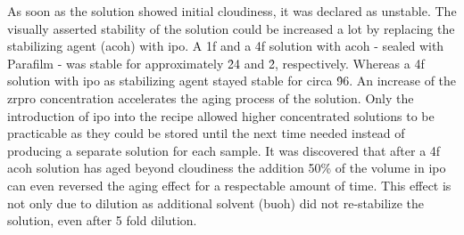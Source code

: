 As soon as the solution showed initial cloudiness, it was declared as unstable. 
The visually asserted stability of the solution could be increased a lot by replacing the stabilizing agent (\gls{acoh}) with \gls{ipo}.
A \gls{1f} and a \gls{4f} solution with \gls{acoh} - sealed with Parafilm - was stable for approximately \h{24} and \h{2}, respectively.
Whereas a \gls{4f} solution with \gls{ipo} as stabilizing agent stayed stable for circa \h{96}. 
An increase of the \gls{zrpro} concentration accelerates the aging process of the solution.
Only the introduction of \gls{ipo} into the recipe allowed higher concentrated solutions to be practicable 
as they could be stored until the next time needed instead of producing a separate solution for each sample.
%
It was discovered that after a \gls{4f} \gls{acoh} solution has aged beyond cloudiness 
the addition 50\% of the volume in \gls{ipo} can even reversed the aging effect for a respectable amount of time. 
This effect is not only due to dilution as additional solvent (\gls{buoh}) did not re-stabilize the solution, 
even after 5 fold dilution. 

